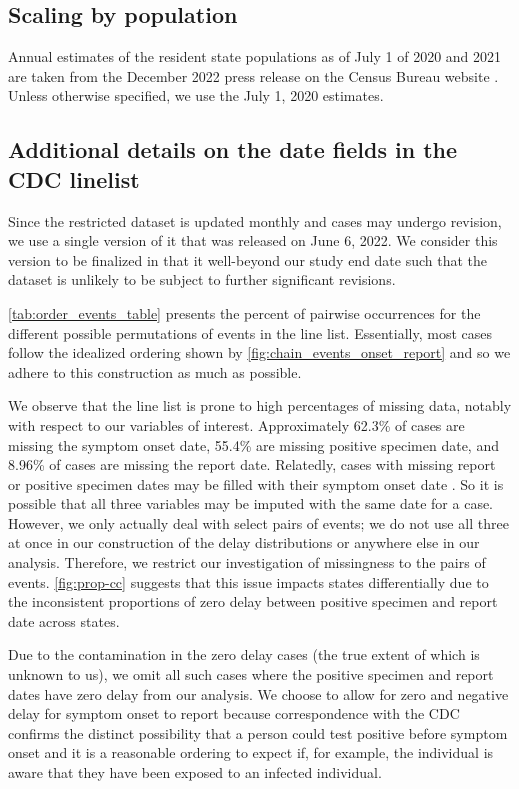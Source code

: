 \documentclass{article}
\begin{document}
\subsection{Scaling by population}

Annual estimates of the resident state
populations as of July 1 of 2020 and 2021 are taken from the December
2022 press release on the \US Census Bureau website \citep{uscensus2022annual}.
Unless otherwise specified, we use the July 1, 2020 estimates.


\subsection{Additional details on the date fields in the CDC linelist}
\label{sec:linelist-details}

Since the restricted dataset is updated
monthly and cases may undergo revision, we use a single version of it that was
released on June 6, 2022. We consider this version to be finalized in that it
well-beyond our study end date such that the dataset is unlikely to be subject
to further significant revisions.

\autoref{tab:order_events_table} presents the percent of pairwise occurrences
for the different possible permutations of events in the line list. Essentially,
most cases follow the idealized ordering shown by
\autoref{fig:chain_events_onset_report} and so we adhere to this construction as
much as possible.

 

We observe that the line list is prone to high percentages of missing data,
notably with respect to our variables of interest. Approximately 62.3\% of cases
are missing the symptom onset date, 55.4\% are missing positive specimen date,
and 8.96\% of cases are missing the report date. Relatedly,
cases with
missing report or positive specimen dates may be filled with their symptom onset date
\citet{jahja2022real}. So it is possible that all three variables may be
imputed with the same date for a case. However, we only actually deal with
select pairs of events; we do not use all three at once in our construction of
the delay distributions or anywhere else in our analysis. Therefore, we restrict
our investigation of missingness to the pairs of events.
\autoref{fig:prop-cc} suggests that this issue impacts states
differentially due to the inconsistent proportions of zero delay between
positive specimen and report date across states. 

Due to the contamination in the zero delay cases (the true extent of which is
unknown to us), we omit all such cases where the positive specimen and report
dates have zero delay from our analysis. We choose to allow for zero and
negative delay for symptom onset to report because correspondence with the CDC
confirms the distinct possibility that a person could test positive before
symptom onset and it is a reasonable ordering to expect if, for example, the
individual is aware that they have been exposed to an infected individual.
\end{document}
